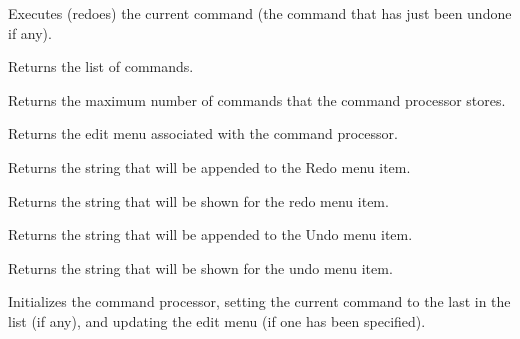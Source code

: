 Executes (redoes) the current command (the command that has just been undone if any).


\label{wxcommandprocessorgetcommands}


Returns the list of commands.


\label{wxcommandprocessorgetmaxcommands}


Returns the maximum number of commands that the command processor stores.


\label{wxcommandprocessorgeteditmenu}


Returns the edit menu associated with the command processor.


\label{wxcommandprocessorgetredoaccelerator}


Returns the string that will be appended to the Redo menu item.


\label{wxcommandprocessorgetredomenulabel}


Returns the string that will be shown for the redo menu item.


\label{wxcommandprocessorgetundoaccelerator}


Returns the string that will be appended to the Undo menu item.


\label{wxcommandprocessorgetundomenulabel}


Returns the string that will be shown for the undo menu item.


\label{wxcommandprocessorinitialize}


Initializes the command processor, setting the current command to the
last in the list (if any), and updating the edit menu (if one has been
specified).


